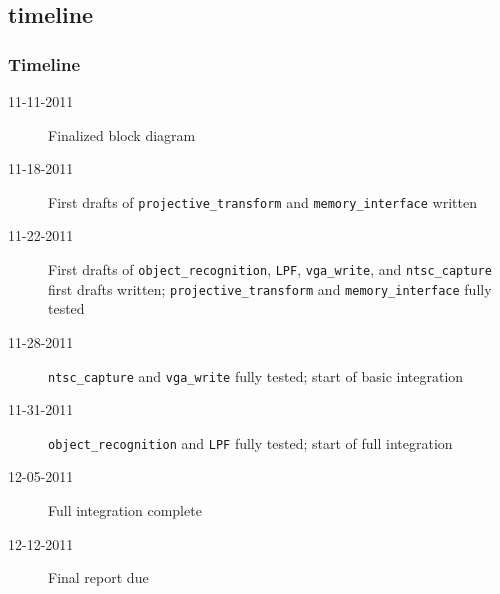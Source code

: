\documentclass{beamer}
\begin{document}
\subsection{timeline}
\begin{frame}
	\frametitle{Timeline}
	\begin{description}
	\item[11-11-2011] Finalized block diagram
	\item[11-18-2011] First drafts of {\tt projective\_transform} and {\tt memory\_interface} written
	\item[11-22-2011] First drafts of {\tt object\_recognition}, {\tt LPF}, {\tt vga\_write}, and {\tt ntsc\_capture} first drafts written; {\tt projective\_transform} and {\tt memory\_interface} fully tested
	\item[11-28-2011] {\tt ntsc\_capture} and {\tt vga\_write} fully tested; start of basic integration
	\item[11-31-2011] {\tt object\_recognition} and {\tt LPF} fully tested; start of full integration
	\item[12-05-2011] Full integration complete
	\item[12-12-2011] Final report due
	\end{description}
\end{frame}
\end{document}
